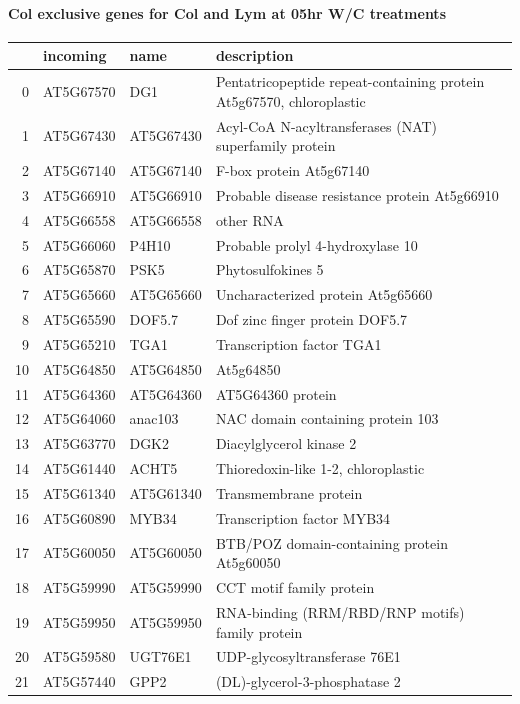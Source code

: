 \documentclass[11pt]{article}
\begin{document}
\paragraph{Col exclusive genes for Col and Lym at 05hr W/C treatments}
\label{sec:org19d4a0c}
\begin{center}
\begin{tabular}{rlll}
 & incoming & name & description\\
\hline
0 & AT5G67570 & DG1 & Pentatricopeptide repeat-containing protein At5g67570, chloroplastic\\
1 & AT5G67430 & AT5G67430 & Acyl-CoA N-acyltransferases (NAT) superfamily protein\\
2 & AT5G67140 & AT5G67140 & F-box protein At5g67140\\
3 & AT5G66910 & AT5G66910 & Probable disease resistance protein At5g66910\\
4 & AT5G66558 & AT5G66558 & other RNA\\
5 & AT5G66060 & P4H10 & Probable prolyl 4-hydroxylase 10\\
6 & AT5G65870 & PSK5 & Phytosulfokines 5\\
7 & AT5G65660 & AT5G65660 & Uncharacterized protein At5g65660\\
8 & AT5G65590 & DOF5.7 & Dof zinc finger protein DOF5.7\\
9 & AT5G65210 & TGA1 & Transcription factor TGA1\\
10 & AT5G64850 & AT5G64850 & At5g64850\\
11 & AT5G64360 & AT5G64360 & AT5G64360 protein\\
12 & AT5G64060 & anac103 & NAC domain containing protein 103\\
13 & AT5G63770 & DGK2 & Diacylglycerol kinase 2\\
14 & AT5G61440 & ACHT5 & Thioredoxin-like 1-2, chloroplastic\\
15 & AT5G61340 & AT5G61340 & Transmembrane protein\\
16 & AT5G60890 & MYB34 & Transcription factor MYB34\\
17 & AT5G60050 & AT5G60050 & BTB/POZ domain-containing protein At5g60050\\
18 & AT5G59990 & AT5G59990 & CCT motif family protein\\
19 & AT5G59950 & AT5G59950 & RNA-binding (RRM/RBD/RNP motifs) family protein\\
20 & AT5G59580 & UGT76E1 & UDP-glycosyltransferase 76E1\\
21 & AT5G57440 & GPP2 & (DL)-glycerol-3-phosphatase 2\\

\end{tabular}
\end{center}
\end{document}
